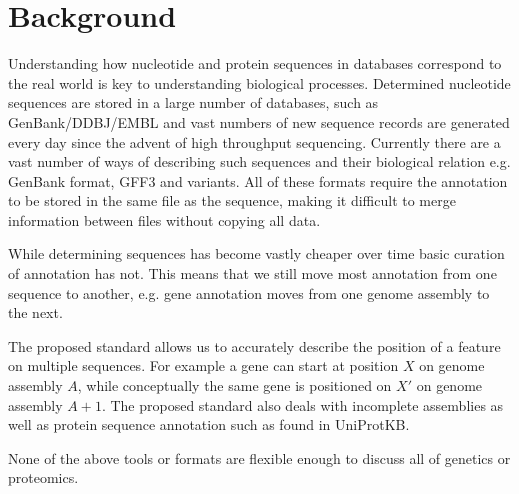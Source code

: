 \section*{Background}
Understanding how nucleotide and protein sequences in databases correspond to the real world is key to understanding biological processes.
Determined nucleotide sequences are stored in a large number of databases,
such as GenBank/DDBJ/EMBL and vast numbers of new sequence records are generated every day since the advent of high throughput sequencing.
Currently there are a vast number of ways of describing such sequences and their biological relation e.g. GenBank format, GFF3 and variants.
All of these formats require the annotation to be stored in the same file as the sequence,
making it difficult to merge information between files without copying all data.

While determining sequences has become vastly cheaper over time basic curation of annotation has not.
This means that we still move most annotation from one sequence to another,
e.g. gene annotation moves from one genome assembly to the next.

The proposed standard allows us to accurately describe the position of a feature on multiple sequences.
For example a gene can start at position $X$ on genome assembly $A$,
while conceptually the same gene is positioned on $X'$ on genome assembly $A+1$.
The proposed standard also deals with incomplete assemblies as well as protein sequence annotation such as found in UniProtKB.

None of the above tools or formats are flexible enough to discuss all of genetics or proteomics. 

